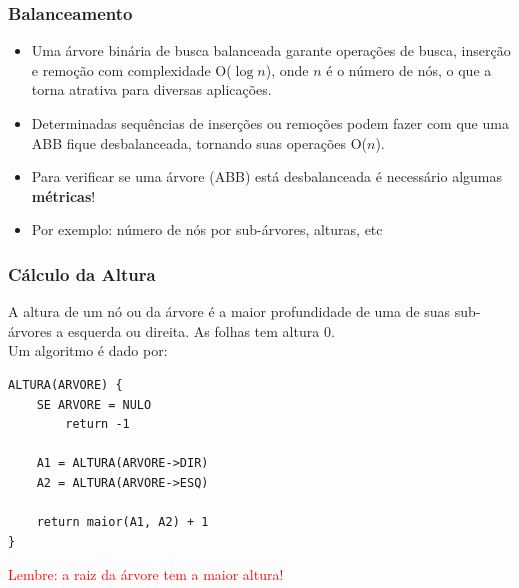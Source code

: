 \begin{frame}

    \frametitle{Balanceamento}
\begin{block}{}
        
   \begin{itemize}
      \item  Uma árvore binária de busca balanceada garante operações de busca, inserção e
    remoção com complexidade O($\log n$), onde $n$ é o número de nós, o que a torna atrativa  para diversas aplicações.
    
      \item   Determinadas sequências de inserções ou remoções podem fazer com que uma ABB fique  desbalanceada, tornando suas operações O($n$). 

      \item Para verificar se uma árvore (ABB) está desbalanceada é necessário
      algumas \textbf{métricas}!
      
      \pause
      \item Por exemplo: número de nós por sub-árvores, alturas, etc
           

    \end{itemize}
    \end{block}
    

\end{frame}


\begin{frame}[fragile]
\frametitle{Cálculo da Altura}

\begin{block}{}
A altura de um nó ou da árvore é a maior profundidade de uma de 
suas sub-árvores a esquerda ou direita. As folhas tem altura 0.\\
 Um algoritmo é  dado por:
\end{block}

\begin{verbatim}
ALTURA(ARVORE) {
    SE ARVORE = NULO
        return -1
        
    A1 = ALTURA(ARVORE->DIR)
    A2 = ALTURA(ARVORE->ESQ)
    
    return maior(A1, A2) + 1
}
\end{verbatim}

\textcolor{red}{Lembre: a raiz da árvore tem a maior altura!}

\end{frame}

